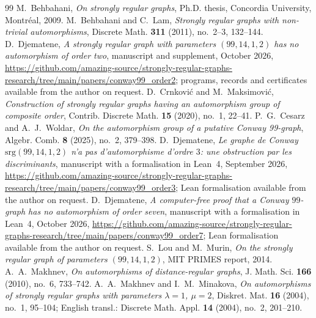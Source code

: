 \documentclass[11pt]{amsart}
\theoremstyle{remark}
\begin{document}
\begin{thebibliography}{99}
 M.~Behbahani, \emph{On strongly regular graphs}, Ph.D. thesis, Concordia University, Montr\'eal, 2009.
 M.~Behbahani and C.~Lam, \emph{Strongly regular graphs with non-trivial automorphisms}, Discrete Math.
\textbf{311} (2011), no.~2--3, 132--144.
 D.~Djematene, \emph{A strongly regular graph with parameters $(99,14,1,2)$
has no automorphism of order two}, manuscript and supplement, October 2026,
\url{https://github.com/amazing-source/strongly-regular-graphs-research/tree/main/papers/conway99_order2}; programs, records and certificates available from the author on request.
 D.~Crnkovi\'c and M.~Maksimovi\'c, \emph{Construction of strongly regular graphs having an automorphism
group of composite order}, Contrib. Discrete Math. \textbf{15} (2020), no.~1, 22--41.
 P.~G.~Cesarz and A.~J.~Woldar, \emph{On the automorphism group of a putative Conway 99-graph}, Algebr.
Comb. \textbf{8} (2025), no.~2, 379--398.
 D.~Djematene, \emph{Le graphe de Conway $\mathrm{srg}(99,14,1,2)$ n'a pas
d'automorphisme d'ordre $3$: une obstruction par les discriminants}, manuscript with a formalisation in Lean~4, September
2026, \url{https://github.com/amazing-source/strongly-regular-graphs-research/tree/main/papers/conway99_order3}; Lean formalisation available from the author on request.
 D.~Djematene, \emph{A computer-free proof that a Conway $99$-graph has no
automorphism of order seven}, manuscript with a formalisation in Lean~4, October 2026,
\url{https://github.com/amazing-source/strongly-regular-graphs-research/tree/main/papers/conway99_order7}; Lean formalisation available from the author on request.
 S.~Lou and M.~Murin, \emph{On the strongly regular graph of parameters $(99,14,1,2)$}, MIT PRIMES
report, 2014.
 A.~A.~Makhnev, \emph{On automorphisms of distance-regular graphs}, J. Math. Sci. \textbf{166} (2010),
no.~6, 733--742.
 A.~A.~Makhnev and I.~M.~Minakova, \emph{On automorphisms of strongly regular graphs with parameters
$\lambda=1$, $\mu=2$}, Diskret. Mat. \textbf{16} (2004), no.~1, 95--104; English transl.: Discrete Math. Appl. \textbf{14}
(2004), no.~2, 201--210.
\end{thebibliography}
\end{document}
